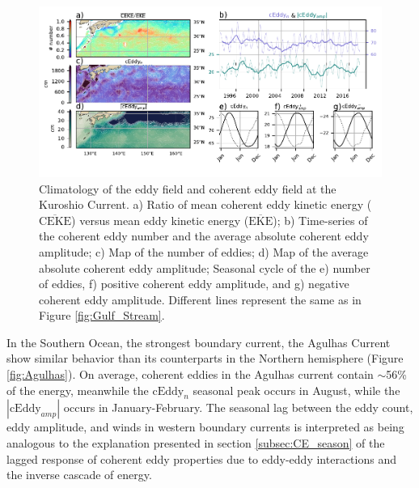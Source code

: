 \documentclass[draft,linenumbers]{agujournal2019}
\newcommand{\MEKE}{\overline{\textrm{EKE}}}
\newcommand{\MCEKE}{\overline{\textrm{CEKE}}}
\newcommand{\cEddy}{\textrm{cEddy}}
\begin{document}
	\begin{figure}
	    \centering
	    \includegraphics[width=1\textwidth]{figures/regional_ratios_and_stats_V3_4.pdf}
	    \caption{Climatology of the eddy field and coherent eddy field at the Kuroshio Current. a) Ratio of mean coherent eddy kinetic energy ($\MCEKE$) versus mean eddy kinetic energy ($\MEKE$); b) Time-series of the coherent eddy number and the average absolute coherent eddy amplitude; c) Map of the number of eddies; d) Map of the average absolute coherent eddy amplitude; Seasonal cycle of the e) number of eddies, f) positive coherent eddy amplitude, and g) negative coherent eddy amplitude. Different lines represent the same as in Figure \ref{fig:Gulf_Stream}.}
	    \label{fig:Kuroshio}
	\end{figure}

	In the Southern Ocean, the strongest boundary current, the Agulhas Current show similar behavior than its counterparts in the Northern hemisphere (Figure \ref{fig:Agulhas}). On average, coherent eddies in the Agulhas current contain $\sim$56\% of the energy, meanwhile the $\cEddy_{n}$ seasonal peak occurs in August, while the $|\cEddy_{amp}|$ occurs in January-February. 
	The seasonal lag between the eddy count, eddy amplitude, and winds in western boundary currents is interpreted as being analogous to the explanation presented in section \ref{subsec:CE_season} of the lagged response of coherent eddy properties due to eddy-eddy interactions and the inverse cascade of energy.
\end{document}
